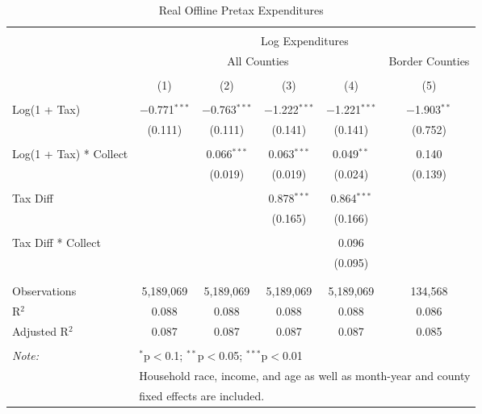 
\begin{table}[!htbp] \centering 
  \caption{Real Offline Pretax Expenditures} 
  \label{} 
\begin{tabular}{@{\extracolsep{5pt}}lccccc} 
\\[-1.8ex]\hline 
\hline \\[-1.8ex] 
 & \multicolumn{5}{c}{Log Expenditures} \\ 
\cline{2-6} 
 & \multicolumn{4}{c}{All Counties} & Border Counties \\ 
\\[-1.8ex] & (1) & (2) & (3) & (4) & (5)\\ 
\hline \\[-1.8ex] 
 Log(1 + Tax) & $-$0.771$^{***}$ & $-$0.763$^{***}$ & $-$1.222$^{***}$ & $-$1.221$^{***}$ & $-$1.903$^{**}$ \\ 
  & (0.111) & (0.111) & (0.141) & (0.141) & (0.752) \\ 
  & & & & & \\ 
 Log(1 + Tax) * Collect &  & 0.066$^{***}$ & 0.063$^{***}$ & 0.049$^{**}$ & 0.140 \\ 
  &  & (0.019) & (0.019) & (0.024) & (0.139) \\ 
  & & & & & \\ 
 Tax Diff &  &  & 0.878$^{***}$ & 0.864$^{***}$ &  \\ 
  &  &  & (0.165) & (0.166) &  \\ 
  & & & & & \\ 
 Tax Diff * Collect &  &  &  & 0.096 &  \\ 
  &  &  &  & (0.095) &  \\ 
  & & & & & \\ 
\hline \\[-1.8ex] 
Observations & 5,189,069 & 5,189,069 & 5,189,069 & 5,189,069 & 134,568 \\ 
R$^{2}$ & 0.088 & 0.088 & 0.088 & 0.088 & 0.086 \\ 
Adjusted R$^{2}$ & 0.087 & 0.087 & 0.087 & 0.087 & 0.085 \\ 
\hline 
\hline \\[-1.8ex] 
\textit{Note:}  & \multicolumn{5}{l}{$^{*}$p$<$0.1; $^{**}$p$<$0.05; $^{***}$p$<$0.01} \\ 
 & \multicolumn{5}{l}{Household race, income, and age as well as month-year and county} \\ 
 & \multicolumn{5}{l}{fixed effects are included.} \\ 
\end{tabular} 
\end{table} 
